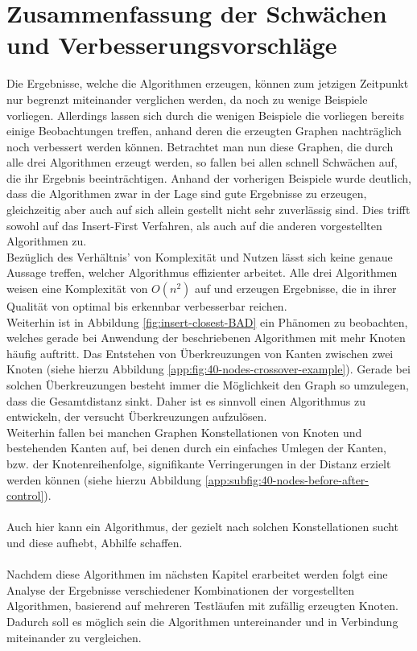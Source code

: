 \section{Zusammenfassung der Schwächen und Verbesserungsvorschläge}\label{sec:allBet}
Die Ergebnisse, welche die Algorithmen erzeugen, können zum jetzigen Zeitpunkt nur begrenzt miteinander verglichen werden, da noch zu wenige Beispiele vorliegen.
Allerdings lassen sich durch die wenigen Beispiele die vorliegen bereits einige Beobachtungen treffen, anhand deren die erzeugten Graphen nachträglich noch verbessert werden können.
Betrachtet man nun diese Graphen, die durch alle drei Algorithmen erzeugt werden, so fallen bei allen schnell Schwächen auf, die ihr Ergebnis beeinträchtigen.
Anhand der vorherigen Beispiele wurde deutlich, dass die Algorithmen zwar in der Lage sind gute Ergebnisse zu erzeugen, gleichzeitig aber auch auf sich allein gestellt nicht sehr zuverlässig sind.
Dies trifft sowohl auf das Insert-First Verfahren, als auch auf die anderen vorgestellten Algorithmen zu.
\\
Bezüglich des Verhältnis' von Komplexität und Nutzen lässt sich keine genaue Aussage treffen, welcher Algorithmus effizienter arbeitet.
Alle drei Algorithmen weisen eine Komplexität von $O(n^2)$ auf und erzeugen Ergebnisse, die in ihrer Qualität von optimal bis erkennbar verbesserbar reichen. 
\\
Weiterhin ist in Abbildung \vref{fig:insert-closest-BAD} ein Phänomen zu beobachten, welches gerade bei Anwendung der beschriebenen Algorithmen mit mehr Knoten häufig auftritt.
Das Entstehen von Überkreuzungen von Kanten zwischen zwei Knoten (siehe hierzu Abbildung \vref{app:fig:40-nodes-crossover-example}).
Gerade bei solchen Überkreuzungen besteht immer die Möglichkeit den Graph so umzulegen, dass die Gesamtdistanz sinkt.
Daher ist es sinnvoll einen Algorithmus zu entwickeln, der versucht Überkreuzungen aufzulösen.
\\
Weiterhin fallen bei manchen Graphen Konstellationen von Knoten und bestehenden Kanten auf, bei denen durch ein einfaches Umlegen der Kanten, bzw. der Knotenreihenfolge, signifikante Verringerungen in der Distanz erzielt werden können (siehe hierzu Abbildung \vref{app:subfig:40-nodes-before-after-control}).
\\\\
Auch hier kann ein Algorithmus, der gezielt nach solchen Konstellationen sucht und diese aufhebt, Abhilfe schaffen.
\\\\
Nachdem diese Algorithmen im nächsten Kapitel erarbeitet werden folgt eine Analyse der Ergebnisse verschiedener Kombinationen der vorgestellten Algorithmen, basierend auf mehreren Testläufen mit zufällig erzeugten Knoten.
Dadurch soll es möglich sein die Algorithmen untereinander und in Verbindung miteinander zu vergleichen.